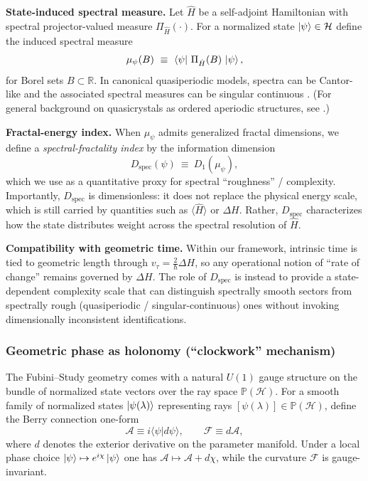 \noindent\textbf{State-induced spectral measure.}
Let $\hat{H}$ be a self-adjoint Hamiltonian with spectral projector-valued measure $\Pi_{\hat{H}}(\cdot)$.
For a normalized state $\ket{\psi}\in\mathcal{H}$ define the induced spectral measure
\begin{equation}
    \mu_{\psi}(B)\ \equiv\ \bra{\psi}\,\Pi_{\hat{H}}(B)\,\ket{\psi},
\end{equation}
for Borel sets $B\subset\mathbb{R}$. In canonical quasiperiodic models, spectra can be Cantor-like and the
associated spectral measures can be singular continuous \cite{Hofstadter1976,KohmotoKadanoffTang1983,Suto1987}.
(For general background on quasicrystals as ordered aperiodic structures, see \cite{LevineSteinhardt1984}.)\par

\noindent\textbf{Fractal-energy index.}
When $\mu_{\psi}$ admits generalized fractal dimensions, we define a \emph{spectral-fractality index} by the
information dimension
\begin{equation}
    D_{\mathrm{spec}}(\psi)\ \equiv\ D_1(\mu_{\psi}),
\end{equation}
which we use as a quantitative proxy for spectral ``roughness'' / complexity. Importantly, $D_{\mathrm{spec}}$
is dimensionless: it does not replace the physical energy scale, which is still carried by quantities such as
$\langle\hat{H}\rangle$ or $\Delta H$. Rather, $D_{\mathrm{spec}}$ characterizes how the state distributes weight
across the spectral resolution of $\hat{H}$.\par

\noindent\textbf{Compatibility with geometric time.}
Within our framework, intrinsic time is tied to geometric length through $v_{\tau}=\frac{2}{\hbar}\Delta H$,
so any operational notion of ``rate of change'' remains governed by $\Delta H$.
The role of $D_{\mathrm{spec}}$ is instead to provide a state-dependent complexity scale that can distinguish
spectrally smooth sectors from spectrally rough (quasiperiodic / singular-continuous) ones without invoking
dimensionally inconsistent identifications.

\subsubsection{Geometric phase as holonomy (``clockwork'' mechanism)}
The Fubini--Study geometry comes with a natural $U(1)$ gauge structure on the bundle of normalized state vectors over the ray space $\mathbb{P}(\mathcal{H})$. For a smooth family of normalized states $\ket{\psi(\lambda)}$ representing rays $[\psi(\lambda)]\in\mathbb{P}(\mathcal{H})$, define the Berry connection one-form \cite{Berry1984}
\begin{equation}
    \mathcal{A} \equiv i\langle\psi|d\psi\rangle,
    \qquad
    \mathcal{F}\equiv d\mathcal{A},
\end{equation}
where $d$ denotes the exterior derivative on the parameter manifold. Under a local phase choice $\ket{\psi}\mapsto e^{i\chi}\ket{\psi}$ one has $\mathcal{A}\mapsto \mathcal{A}+d\chi$, while the curvature $\mathcal{F}$ is gauge-invariant.

